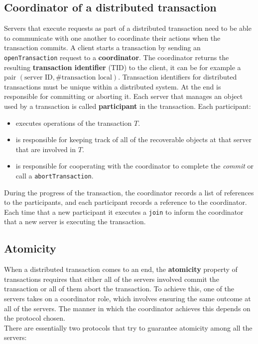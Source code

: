 \subsection{Coordinator of a distributed transaction}
Servers that execute requests as part of a distributed transaction need to be able to communicate with one another to coordinate their actions when the transaction commits. A client starts a transaction by sending an \verb|openTransaction| request to a \textbf{coordinator}. The coordinator returns the resulting \textbf{transaction identifier} (TID) to the client, it can be for example a pair $(\text{server ID}, \#\text{transaction local})$. Transaction identifiers for distributed transactions must be unique within a distributed system. At the end is responsible for committing or aborting it. 
Each server that manages an object used by a transaction is called \textbf{participant} in the transaction. Each participant:
\begin{itemize}
	\item executes operations of the transaction $T$.
	\item is responsible for keeping track of all of the recoverable objects at that server that are involved in $T$.
	\item is responsible for cooperating with the coordinator to complete the \textit{commit} or call a \verb|abortTransaction|.
\end{itemize}
During the progress of the transaction, the coordinator records a list of references to the participants, and each participant records a reference to the coordinator. Each time that a new participant it executes a \verb|join| to inform the coordinator that a new server is executing the transaction.


\subsection{Atomicity}
When a distributed transaction comes to an end, the \textbf{atomicity} property of transactions requires that either all of the servers involved commit the transaction or all of them abort the transaction. To achieve this, one of the servers takes on a coordinator role, which involves ensuring the same outcome at all of the servers. The manner in which the coordinator achieves this depends on the protocol chosen. \\

There are essentially two protocols that try to guarantee atomicity among all the servers:


